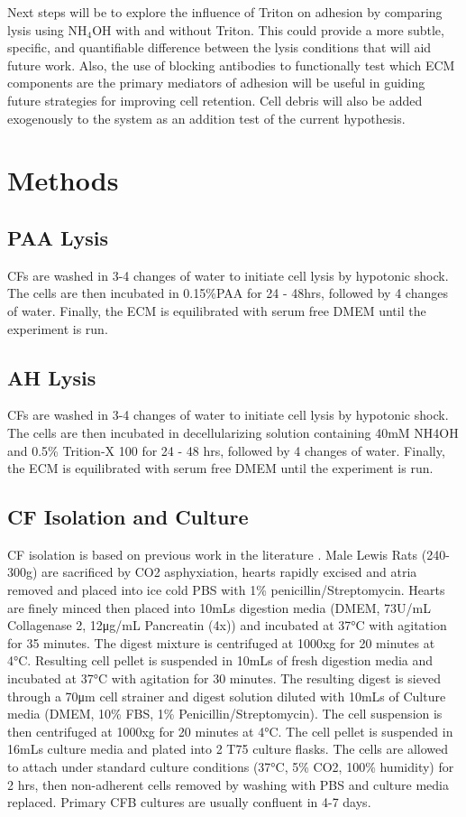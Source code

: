 Next steps will be to explore the influence of Triton on adhesion by comparing lysis using NH$_{4}$OH with and without Triton. This could provide a more subtle, specific, and quantifiable difference between the lysis conditions that will aid future work. Also, the use of blocking antibodies to functionally test which ECM components are the primary mediators of adhesion will be useful in guiding future strategies for improving cell retention. Cell debris will also be added exogenously to the system as an addition test of the current hypothesis.

\section{Methods}

\subsection{PAA Lysis}
CFs are washed in 3-4 changes of water to initiate cell lysis by hypotonic shock.  The cells are then incubated in 0.15\%PAA for 24 - 48hrs, followed by 4 changes of water.  Finally, the ECM is equilibrated with serum free DMEM until the experiment is run.

\subsection{AH Lysis}
CFs are washed in 3-4 changes of water to initiate cell lysis by hypotonic shock.  The cells are then incubated in decellularizing solution containing 40mM NH4OH and 0.5\% Trition-X 100 for 24 - 48 hrs, followed by 4 changes of water.  Finally, the ECM is equilibrated with serum free DMEM until the experiment is run.

\subsection{CF Isolation and Culture}
CF isolation is based on previous work in the literature \cite{Baharvand:2005mi,Dubey:1997qa}. Male Lewis Rats (240-300g) are sacrificed by CO2 asphyxiation, hearts rapidly excised and atria removed and placed into ice cold PBS with 1\% penicillin/Streptomycin.  Hearts are finely minced then placed into 10mLs digestion media (DMEM, 73U/mL Collagenase 2, 12μg/mL Pancreatin (4x)) and incubated at 37°C with agitation for 35 minutes.  The digest mixture is centrifuged at 1000xg for 20 minutes at 4°C.  Resulting cell pellet is suspended in 10mLs of fresh digestion media and incubated at 37°C with agitation for 30 minutes.  The resulting digest is sieved through a 70μm cell strainer and digest solution diluted with 10mLs of Culture media (DMEM, 10\% FBS, 1\% Penicillin/Streptomycin).  The cell suspension is then centrifuged at 1000xg for 20 minutes at 4°C.  The cell pellet is suspended in 16mLs culture media and plated into 2 T75 culture flasks.  The cells are allowed to attach under standard culture conditions (37°C, 5\% CO2, 100\% humidity) for 2 hrs, then non-adherent cells removed by washing with PBS and culture media replaced. Primary CFB cultures are usually confluent in 4-7 days.


